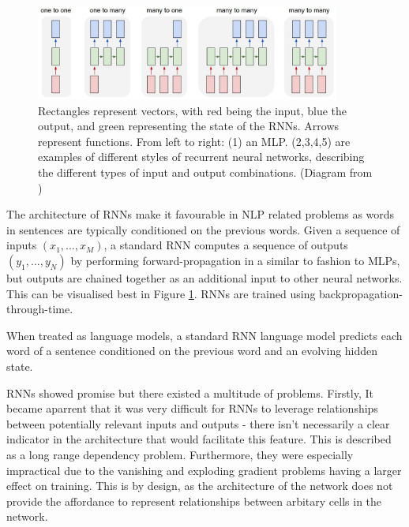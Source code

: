 \documentclass[12pt,twoside]{report}
\begin{document}



\begin{figure}[!ht]
      
	\centering
	\includegraphics[width=100mm]{diagrams/rnn.jpeg}
	\caption{Rectangles represent vectors, with red being the input, blue the output, and green representing the state of the RNNs. Arrows represent  functions. From left to right: (1) an MLP. (2,3,4,5) are examples of different styles of recurrent neural networks, describing the different types of input and output combinations. (Diagram from \cite{karpathy_unreasonable_2015}) \label{rnn}} 
  \end{figure}
  
The architecture of RNNs make it favourable in NLP related problems as words in sentences are typically conditioned on the previous words. Given a sequence of inputs $(x_1, ..., x_M)$, a standard RNN computes a sequence of outputs $(y_1, ..., y_N)$ by performing forward-propagation in a similar to fashion to MLPs, but outputs are chained together as an additional input to other neural networks. This can be visualised best in Figure \ref{rnn}. RNNs are trained using backpropagation-through-time.

When treated as language models, a standard RNN language model predicts each word of a sentence conditioned on the previous word and an evolving hidden state.

RNNs showed promise but there existed a multitude of problems. Firstly, It became aparrent that it was very difficult for RNNs to leverage relationships between potentially relevant inputs and outputs - there isn't necessarily a clear indicator in the architecture that would facilitate this feature. This is described as a long range dependency problem. Furthermore, they were especially impractical due to the vanishing and exploding gradient problems having a larger effect on training. This is by design, as the architecture of the network does not provide the affordance to represent relationships between arbitary cells in the network.
\end{document}
